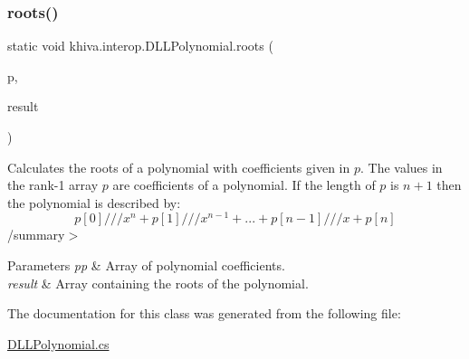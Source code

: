 \mbox{\label{classkhiva_1_1interop_1_1_d_l_l_polynomial_a31f25fb318fb1fe8f4b4c1684e355f96}} 
\subsubsection{\texorpdfstring{roots()}{roots()}}
{\footnotesize\ttfamily static void khiva.\+interop.\+D\+L\+L\+Polynomial.\+roots (\begin{DoxyParamCaption}\item[{\mbox{[}\+In\mbox{]} ref Int\+Ptr}]{p,  }\item[{\mbox{[}\+Out\mbox{]} out Int\+Ptr}]{result }\end{DoxyParamCaption})\hspace{0.3cm}{\ttfamily [static]}}



Calculates the roots of a polynomial with coefficients given in $p$. The values in the rank-\/1 array $p$ are coefficients of a polynomial. If the length of $p$ is $n+1$ then the polynomial is described by\+: \[ p[0] /// x^n + p[1] /// x^{n-1} + ... + p[n-1] /// x + p[n] \] /summary$>$ 
\begin{DoxyParams}{Parameters}
{\em pp} & Array of polynomial coefficients.\\
\hline
{\em result} & Array containing the roots of the polynomial.\\
\hline
\end{DoxyParams}




The documentation for this class was generated from the following file\+:\begin{DoxyCompactItemize}
\item 
\mbox{\hyperlink{_d_l_l_polynomial_8cs}{D\+L\+L\+Polynomial.\+cs}}\end{DoxyCompactItemize}

